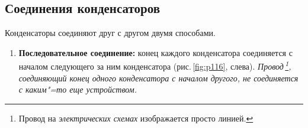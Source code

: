 \documentclass[main.tex]{subfiles}
\begin{document}

\pagestyle{empty}

\begin{NoHyper} %

\setcounter{section}{16
}
\addtocounter{section}{-1} 

\section{Соединения конденсаторов}


Конденсаторы соединяют друг с другом двумя способами. 
\begin{enumerate}
    \item \textbf{Последовательное соединение:} конец каждого конденсатора соединяется с началом следующего за ним конденсатора (рис.\,\ref{fig:p116}, слева). \emph{Провод\,\footnote{Провод на \emph{электрических схемах} изображается просто линией.}, соединяющий конец одного конденсатора с началом другого, не соединяется с каким"=то еще устройством.}
    




    



\end{enumerate}
\end{NoHyper}
\end{document}

